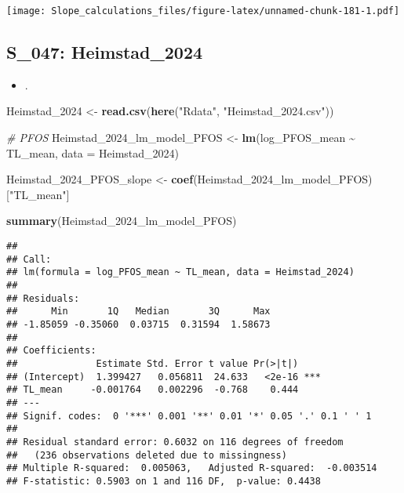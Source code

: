 \documentclass[
]{article}
\newenvironment{Shaded}{\begin{snugshade}}{\end{snugshade}}
\newcommand{\AttributeTok}[1]{\textcolor[rgb]{0.13,0.29,0.53}{#1}}
\newcommand{\CommentTok}[1]{\textcolor[rgb]{0.56,0.35,0.01}{\textit{#1}}}
\newcommand{\FunctionTok}[1]{\textcolor[rgb]{0.13,0.29,0.53}{\textbf{#1}}}
\newcommand{\NormalTok}[1]{#1}
\newcommand{\OtherTok}[1]{\textcolor[rgb]{0.56,0.35,0.01}{#1}}
\newcommand{\SpecialCharTok}[1]{\textcolor[rgb]{0.81,0.36,0.00}{\textbf{#1}}}
\newcommand{\StringTok}[1]{\textcolor[rgb]{0.31,0.60,0.02}{#1}}
\providecommand{\tightlist}{%
  \setlength{\itemsep}{0pt}\setlength{\parskip}{0pt}}
\begin{document}
\texttt{[image: Slope\_calculations\_files/figure-latex/unnamed-chunk-181-1.pdf]}

\subsection{S\_047: Heimstad\_2024}\label{s_047-heimstad_2024-1}

\begin{itemize}
\tightlist
\item
  .
\end{itemize}

\begin{Shaded}
\begin{Highlighting}[]
\NormalTok{Heimstad\_2024 }\OtherTok{\textless{}{-}} \FunctionTok{read.csv}\NormalTok{(}\FunctionTok{here}\NormalTok{(}\StringTok{"Rdata"}\NormalTok{, }\StringTok{"Heimstad\_2024.csv"}\NormalTok{))}

\CommentTok{\# PFOS}
\NormalTok{Heimstad\_2024\_lm\_model\_PFOS }\OtherTok{\textless{}{-}} \FunctionTok{lm}\NormalTok{(log\_PFOS\_mean }\SpecialCharTok{\textasciitilde{}}\NormalTok{ TL\_mean,}
                                    \AttributeTok{data =}\NormalTok{ Heimstad\_2024)}

\NormalTok{Heimstad\_2024\_PFOS\_slope }\OtherTok{\textless{}{-}} \FunctionTok{coef}\NormalTok{(Heimstad\_2024\_lm\_model\_PFOS)[}\StringTok{"TL\_mean"}\NormalTok{]}

\FunctionTok{summary}\NormalTok{(Heimstad\_2024\_lm\_model\_PFOS)}
\end{Highlighting}
\end{Shaded}

\begin{verbatim}
## 
## Call:
## lm(formula = log_PFOS_mean ~ TL_mean, data = Heimstad_2024)
## 
## Residuals:
##      Min       1Q   Median       3Q      Max 
## -1.85059 -0.35060  0.03715  0.31594  1.58673 
## 
## Coefficients:
##              Estimate Std. Error t value Pr(>|t|)    
## (Intercept)  1.399427   0.056811  24.633   <2e-16 ***
## TL_mean     -0.001764   0.002296  -0.768    0.444    
## ---
## Signif. codes:  0 '***' 0.001 '**' 0.01 '*' 0.05 '.' 0.1 ' ' 1
## 
## Residual standard error: 0.6032 on 116 degrees of freedom
##   (236 observations deleted due to missingness)
## Multiple R-squared:  0.005063,   Adjusted R-squared:  -0.003514 
## F-statistic: 0.5903 on 1 and 116 DF,  p-value: 0.4438
\end{verbatim}
\end{document}
